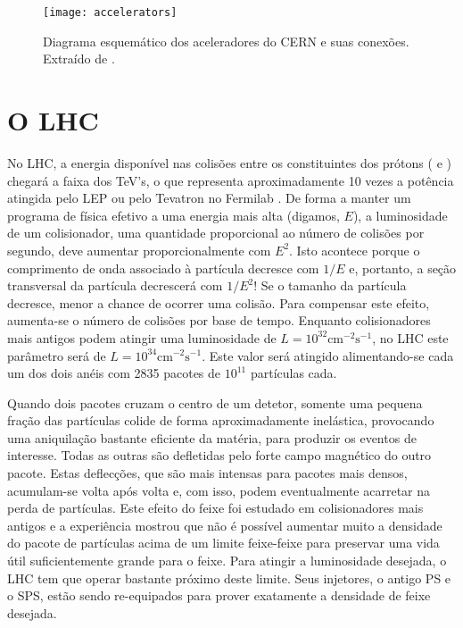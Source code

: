 \begin{figure}
\begin{center}
\texttt{[image: accelerators]}
\end{center}
\caption{Diagrama esquemático dos aceleradores do CERN e suas
conexões. Extraído de \cite{cern}.}
\label{fig:accel}
\end{figure}

\section{O LHC}

No LHC, a energia disponível nas colisões entre os constituintes dos prótons
( e ) chegará a faixa dos TeV's, o que
representa aproximadamente 10 vezes a potência atingida pelo LEP ou pelo
Tevatron no Fermilab \cite{lhc}. De forma a manter um programa de física
efetivo a uma energia mais alta (digamos, $E$), a luminosidade de um
colisionador, uma quantidade proporcional ao número de colisões por segundo,
deve aumentar proporcionalmente com $E^2$. Isto acontece porque o comprimento
de onda associado à partícula decresce com $1/E$ e, portanto, a seção
transversal da partícula decrescerá com $1/E^2$! Se o tamanho da partícula
decresce, menor a chance de ocorrer uma colisão. Para compensar este efeito,
aumenta-se o número de colisões por base de tempo. Enquanto colisionadores
mais antigos podem atingir uma luminosidade de $L = 10^{32}
\text{cm}^{-2}\text{s}^{-1}$, no LHC este parâmetro será de $L = 10^{34}
\text{cm}^{-2}\text{s}^{-1}$. Este valor será atingido alimentando-se cada um dos
dois anéis com 2835 pacotes de $10^{11}$ partículas cada.

Quando dois pacotes cruzam o centro de um detetor, somente uma pequena fração
das partículas colide de forma aproximadamente inelástica, provocando uma
aniquilação bastante eficiente da matéria, para produzir os eventos de
interesse. Todas as outras são defletidas pelo forte campo magnético do outro
pacote. Estas deflecções, que são mais intensas para pacotes mais densos,
acumulam-se volta após volta e, com isso, podem eventualmente acarretar na
perda de partículas. Este efeito do feixe foi estudado em colisionadores mais
antigos e a experiência mostrou que não é possível aumentar muito a densidade
do pacote de partículas acima de um limite feixe-feixe para preservar uma vida
útil suficientemente grande para o feixe. Para atingir a luminosidade
desejada, o LHC tem que operar bastante próximo deste limite. Seus injetores,
o antigo PS e o SPS, estão sendo re-equipados para prover exatamente a
densidade de feixe desejada.

